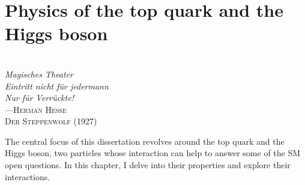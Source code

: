 






\chapter{Physics of the top quark and the Higgs boson}
\label{chap:topHiggsPhysics}

\vspace*{0.1 cm} 
\hspace*{200pt} \\
\hspace*{220pt} \textit{Magisches Theater} \\
\hspace*{220pt} \textit{Eintritt nicht für jedermann} \\
\hspace*{220pt} \textit{Nur für Verrückte!} \\
\hspace*{240pt} ---\textsc{Herman Hesse } \\%
\hspace*{265pt}     \textsc{Der Steppenwolf (1927)} \\%
\vspace*{2cm} 

The central focus of this dissertation revolves around the top quark and the Higgs boson, 
two particles whose interaction can help to answer some of the SM open questions.
In this chapter, I delve into their properties and explore their interactions.

